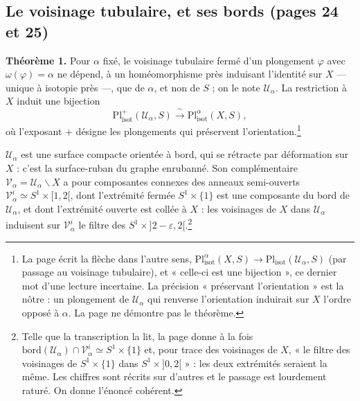 \documentclass[11pt,a4paper]{article}
\begin{document}
\subsection*{Le voisinage tubulaire, et ses bords (pages 24 et 25)}

\textbf{Théorème 1.} Pour $\alpha$ fixé, le voisinage tubulaire fermé d'un
plongement $\varphi$ avec $\omega(\varphi) = \alpha$ ne dépend, à un
homéomorphisme près induisant l'identité sur $X$ --- unique à isotopie
près ---, que de $\alpha$, et non de $S$ ; on le note $\mathcal{U}_\alpha$.
La restriction à $X$ induit une bijection
\[
\mathrm{Pl}^{+}_{\mathrm{isot}}(\mathcal{U}_\alpha, S) \xrightarrow{\ \sim\ } \mathrm{Pl}^{\alpha}_{\mathrm{isot}}(X, S),
\]
où l'exposant $+$ désigne les plongements qui préservent
l'orientation.\footnote{La page écrit la flèche dans l'autre sens,
$\mathrm{Pl}^{\alpha}_{\mathrm{isot}}(X,S) \to \mathrm{Pl}_{\mathrm{isot}}(\mathcal{U}_\alpha, S)$
(par passage au voisinage tubulaire), et « celle-ci est une bijection », ce
dernier mot d'une lecture incertaine. La précision « préservant
l'orientation » est la nôtre : un plongement de $\mathcal{U}_\alpha$ qui
renverse l'orientation induirait sur $X$ l'ordre opposé à $\alpha$. La page
ne démontre pas le théorème.}

$\mathcal{U}_\alpha$ est une surface compacte orientée à bord, qui se
rétracte par déformation sur $X$ : c'est la surface-ruban du graphe
enrubanné. Son complémentaire
$\mathcal{V}_\alpha = \mathcal{U}_\alpha \smallsetminus X$ a pour composantes
connexes des anneaux semi-ouverts $\mathcal{V}^{i}_\alpha \simeq S^{1} \times [1, 2[$,
dont l'extrémité fermée $S^{1} \times \{1\}$ est une composante du bord de
$\mathcal{U}_\alpha$, et dont l'extrémité ouverte est collée à $X$ : les
voisinages de $X$ dans $\mathcal{U}_\alpha$ induisent sur
$\mathcal{V}^{i}_\alpha$ le filtre des $S^{1} \times {]2 - \varepsilon, 2[}$.\footnote{Telle
que la transcription la lit, la page donne à la fois
$\mathrm{bord}(\mathcal{U}_\alpha) \cap \mathcal{V}^{i}_\alpha \simeq S^{1} \times \{1\}$
et, pour trace des voisinages de $X$, « le filtre des voisinages de
$S^{1} \times \{1\}$ dans $S^{1} \times {]0,2[}$ » : les deux extrémités
seraient la même. Les chiffres sont récrits sur d'autres et le passage est
lourdement raturé. On donne l'énoncé cohérent.}
\end{document}
